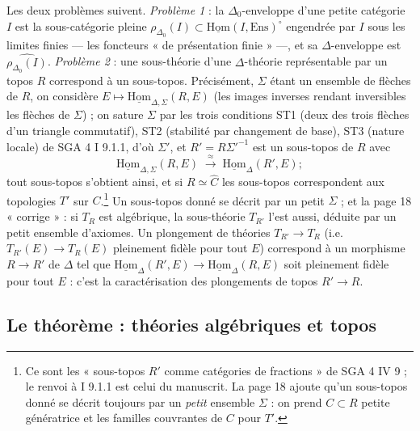 \documentclass[11pt,a4paper]{article}
\begin{document}
Les deux problèmes suivent. \emph{Problème 1} : la $\Delta_{0}$-enveloppe
d'une petite catégorie $I$ est la sous-catégorie pleine $\rho_{\Delta_{0}}(I)
\subset \underline{\mathrm{Hom}}(I, \mathrm{Ens})^{\circ}$ engendrée par $I$
sous les limites finies — les foncteurs « de présentation finie » —, et sa
$\Delta$-enveloppe est $\widehat{\rho_{\Delta_{0}}(I)}$. \emph{Problème 2} :
une sous-théorie d'une $\Delta$-théorie représentable par un topos $R$
correspond à un sous-topos. Précisément, $\Sigma$ étant un ensemble de
flèches de $R$, on considère $E \mapsto \underline{\mathrm{Hom}}_{\Delta,
\Sigma}(R, E)$ (les images inverses rendant inversibles les flèches de
$\Sigma$) ; on sature $\Sigma$ par les trois conditions ST1 (deux des trois
flèches d'un triangle commutatif), ST2 (stabilité par changement de base),
ST3 (nature locale) de SGA 4 I 9.1.1, d'où $\Sigma'$, et $R' = R\Sigma'^{-1}$
est un sous-topos de $R$ avec
\[
\underline{\mathrm{Hom}}_{\Delta,\Sigma}(R, E) \;\xrightarrow{\ \approx\ }\;
\underline{\mathrm{Hom}}_{\Delta}(R', E) ;
\]
tout sous-topos s'obtient ainsi, et si $R \simeq \widehat{C}$ les
sous-topos correspondent aux topologies $T'$ sur $C$.\footnote{Ce sont les
« sous-topos $R'$ comme catégories de fractions » de SGA 4 IV 9 ; le
renvoi à I 9.1.1 est celui du manuscrit. La page 18 ajoute qu'un sous-topos
donné se décrit toujours par un \emph{petit} ensemble $\Sigma$ : on prend
$C \subset R$ petite génératrice et les familles couvrantes de $C$ pour
$T'$.} Un sous-topos donné se décrit par un petit $\Sigma$ ; et la page 18
« corrige » : si $T_{R}$ est algébrique, la sous-théorie $T_{R'}$ l'est
aussi, déduite par un petit ensemble d'axiomes. Un plongement de théories
$T_{R'} \to T_{R}$ (i.e. $T_{R'}(E) \to T_{R}(E)$ pleinement fidèle pour tout
$E$) correspond à un morphisme $R \to R'$ de $\Delta$ tel que
$\underline{\mathrm{Hom}}_{\Delta}(R', E) \to \underline{\mathrm{Hom}}_{
\Delta}(R, E)$ soit pleinement fidèle pour tout $E$ : c'est la
caractérisation des plongements de topos $R' \to R$.

\subsection*{Le théorème : théories algébriques et topos}
\end{document}
